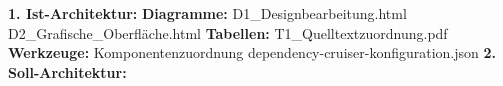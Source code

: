 \textbf{1. Ist-Architektur:}\newline
\indent \textbf{Diagramme:}\newline
\indent \indent D1\_Designbearbeitung.html\newline
\indent \indent D2\_Grafische\_Oberfläche.html\newline
\indent \textbf{Tabellen:}\newline
\indent \indent T1\_Quelltextzuordnung.pdf\newline
\indent \textbf{Werkzeuge:}\newline
\indent \indent Komponentenzuordnung\newline
\indent \indent dependency-cruiser-konfiguration.json\newline
\textbf{2. Soll-Architektur:}